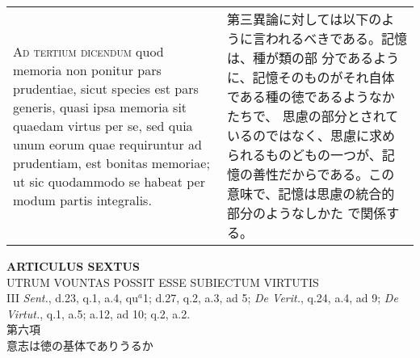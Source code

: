 \documentclass[10pt]{jsarticle}
\begin{document}
\begin{longtable}{p{21em}p{21em}}
\\

{\scshape Ad tertium dicendum} quod memoria non ponitur pars
prudentiae, sicut species est pars generis, quasi ipsa memoria sit
quaedam virtus per se, sed quia unum eorum quae requiruntur ad
prudentiam, est bonitas memoriae; ut sic quodammodo se habeat per
modum partis integralis.

&

 第三異論に対しては以下のように言われるべきである。記憶は、種が類の部
分であるように、記憶そのものがそれ自体である種の徳であるようなかたちで、
思慮の部分とされているのではなく、思慮に求められるものどもの一つが、記
憶の善性だからである。この意味で、記憶は思慮の統合的部分のようなしかた
で関係する。
 

\end{longtable}
\newpage

\begin{center}
{\Large {\bf ARTICULUS SEXTUS}}\\
{\large UTRUM VOUNTAS POSSIT ESSE SUBIECTUM VIRTUTIS}\\
{\footnotesize III {\itshape Sent.}, d.23, q.1, a.4, qu$^{a}$1; d.27, q.2, a.3, ad 5; {\itshape De Verit.}, q.24, a.4, ad 9; {\itshape De Virtut.}, q.1, a.5; a.12, ad 10; q.2, a.2.}\\
{\Large 第六項\\意志は徳の基体でありうるか}
\end{center}
\end{document}
